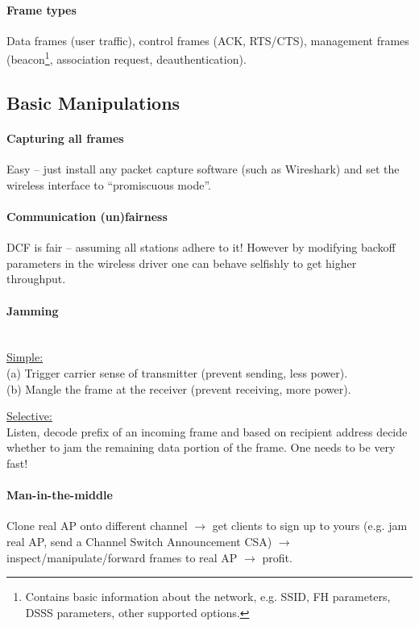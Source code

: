\paragraph{Frame types}
Data frames (user traffic), control frames (ACK, RTS/CTS), management frames (beacon\footnote{Contains basic information about the network, e.g. SSID, FH parameters, DSSS parameters, other supported options.}, association request, deauthentication).


\subsection{Basic Manipulations}

\paragraph{Capturing all frames}
Easy -- just install any packet capture software (such as Wireshark) and set the wireless interface to ``promiscuous mode''.

\paragraph{Communication (un)fairness}
DCF is fair -- assuming all stations adhere to it!
However by modifying backoff parameters in the wireless driver one can behave selfishly to get higher throughput.

\paragraph{Jamming} \mbox{} \\
\underline{Simple:} \\
(a) Trigger carrier sense of transmitter (prevent sending, less power). \\
(b) Mangle the frame at the receiver (prevent receiving, more power).

\underline{Selective:} \\
Listen, decode prefix of an incoming frame and based on recipient address decide whether to jam the remaining data portion of the frame.
One needs to be very fast!

\paragraph{Man-in-the-middle}
Clone real AP onto different channel
$\rightarrow$ get clients to sign up to yours (e.g. jam real AP, send a Channel Switch Announcement CSA)
$\rightarrow$ inspect/manipulate/forward frames to real AP
$\rightarrow$ profit.


